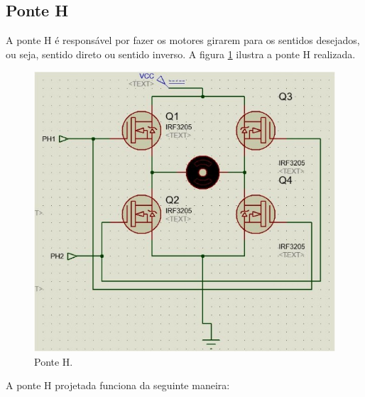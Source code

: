\subsection{Ponte H}

A ponte H é responsável por fazer os motores girarem para os sentidos desejados, ou seja, sentido direto ou sentido inverso.
A figura \ref{fig:ponte} ilustra a ponte H realizada.

\begin{figure}[h!]
  \centering
    \includegraphics[scale=0.5]{figuras/Ponte_H.jpg}
  \caption{Ponte H.}
    \label{fig:ponte}
\end{figure}

A ponte H projetada funciona da seguinte maneira: 

